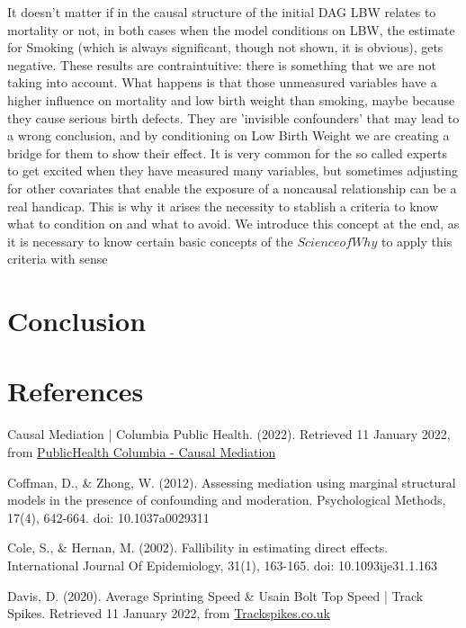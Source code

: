 \documentclass{article}
\begin{document}
It doesn't matter if in the causal structure of the initial DAG LBW relates to mortality or not, in both cases when the model conditions on LBW, the estimate for Smoking (which is always significant, though not shown, it is obvious), gets negative. These results are contraintuitive: there is something that we are not taking into account. 
What happens is that those unmeasured variables have a higher influence on mortality and low birth weight than smoking, maybe because they cause serious birth defects. They are 'invisible confounders' that may lead to a wrong conclusion, and by conditioning on Low Birth Weight we are creating a bridge for them to show their effect.
It is very common for the so called experts to get excited when they have measured many variables, but sometimes adjusting for other covariates that enable the exposure of a non\-causal relationship can be a real handicap. This is why it arises the necessity to stablish a criteria to know what to condition on and what to avoid.
We introduce this concept at the end, as it is necessary to know certain basic concepts of the \(Science of Why\) to apply this criteria with sense





\section{Conclusion}









\section{References}

Causal Mediation | Columbia Public Health. (2022). Retrieved 11 January 2022, from \href{https://www.publichealth.columbia.edu/research/population-health-methods/causal-mediation}{PublicHealth Columbia - Causal Mediation}

Coffman, D., \& Zhong, W. (2012). Assessing mediation using marginal structural models in the presence of confounding and moderation. Psychological Methods, 17(4), 642-664. doi: 10.1037\/a0029311

Cole, S., \& Hernan, M. (2002). Fallibility in estimating direct effects. International Journal Of Epidemiology, 31(1), 163-165. doi: 10.1093\/ije\/31.1.163

Davis, D. (2020). Average Sprinting Speed \& Usain Bolt Top Speed | Track Spikes. Retrieved 11 January 2022, from \href{https://trackspikes.co.uk/average-sprinting-speed/#}{Trackspikes.co.uk}
\end{document}
